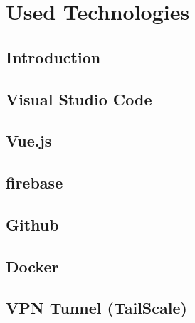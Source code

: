 \chapter{Used Technologies} %
\label{chap:used_technologies}

\section{Introduction}


\section{Visual Studio Code}

\section{Vue.js}

\section{firebase}



\section{Github} %

\section{Docker}
    

\section{VPN Tunnel (TailScale)} %
